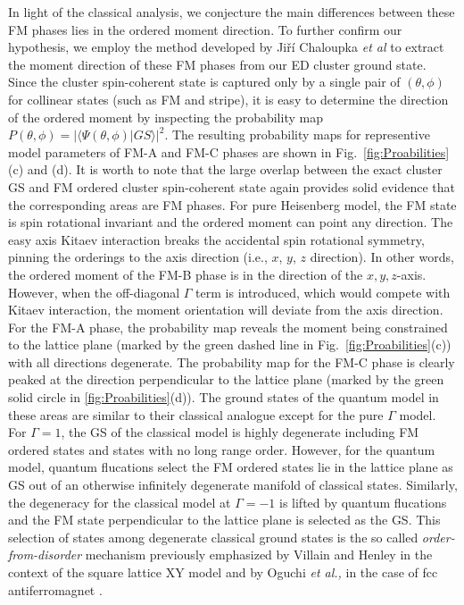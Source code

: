 \documentclass[aps,prb,reprint,amsfonts,amsmath,amssymb,showpacs,groupedaddress,superscriptaddress]{revtex4-1}
\begin{document}
In light of the classical analysis, we conjecture the main differences between these FM phases lies in the ordered moment direction. To further confirm our hypothesis, we employ the method developed by Ji\v{r}\'{i} Chaloupka \emph{et  al} \cite{PhysRevB.94.064435} to extract the moment direction of these FM phases from our ED cluster ground state. Since the cluster spin-coherent state is captured only by a single pair of $(\theta, \phi)$ for collinear states (such as FM and stripe), it is easy to determine the direction of the ordered moment by inspecting the probability map $P(\theta, \phi) = | \langle \Psi (\theta, \phi) | GS \rangle |^2$. The resulting probability maps for representive model parameters of FM-A and FM-C phases are shown in Fig.~\ref{fig:Proabilities}(c) and (d). It is worth to note that the large overlap between the exact cluster GS and FM ordered cluster spin-coherent state again provides solid evidence that the corresponding areas are FM phases. For pure Heisenberg model, the FM state is spin rotational invariant and the ordered moment can point any direction. The easy axis Kitaev interaction breaks the accidental spin rotational symmetry, pinning the orderings to the axis direction (i.e., $x$, $y$, $z$ direction). In other words, the ordered moment of the FM-B phase is in the direction of the $x,y,z$-axis. However, when the off-diagonal $\Gamma$ term is introduced, which would compete with Kitaev interaction, the moment orientation will deviate from the axis direction. For the FM-A phase, the probability map reveals the moment being constrained to the lattice plane (marked by the green dashed line in Fig.~\ref{fig:Proabilities}(c)) with all directions degenerate. The probability map for the FM-C phase is clearly peaked at the direction perpendicular to the lattice plane (marked by the green solid circle in \ref{fig:Proabilities}(d)). The ground states of the quantum model in these areas are similar to their classical analogue except for the pure $\Gamma$ model. For $\Gamma=1$, the GS of the classical model is highly degenerate including FM ordered states and states with no long range order. However, for the quantum model, quantum flucations select the FM ordered states lie in the lattice plane as GS out of an otherwise infinitely degenerate manifold of classical states. Similarly, the degeneracy for the classical model at $\Gamma=-1$ is lifted by quantum flucations and the FM state perpendicular to the lattice plane is selected as the GS. This selection of states among degenerate classical ground states is the so called \emph{order-from-disorder} mechanism previously emphasized by Villain and Henley in the context of the square lattice XY model \cite{PhysRevLett.62.2056} and by Oguchi \emph{et al.,} in the case of fcc antiferromagnet \cite{JPSJ.54.4494}.
\end{document}
